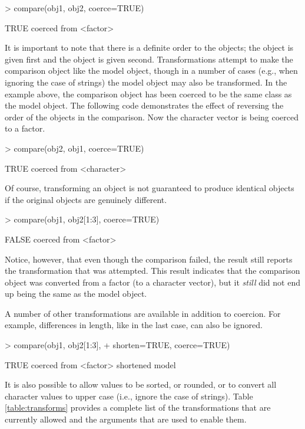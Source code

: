 \begin{Schunk}
\begin{Sinput}
> compare(obj1, obj2, coerce=TRUE)
\end{Sinput}
\begin{Soutput}
TRUE
  coerced from <factor>
\end{Soutput}
\end{Schunk}

It is important to note that there is a definite order to the
objects;  the  object is given first and the 
 object is given second.  Transformations
attempt to make the comparison object like the model object,
though in a number of cases (e.g., 
when ignoring the case of strings) the model object may also
be transformed.  In the example above, the comparison object
has been coerced to be the same class as
the model object.  The following code demonstrates the effect
of reversing the order of the objects in the comparison.  Now
the character vector is being coerced to a factor.

\begin{Schunk}
\begin{Sinput}
> compare(obj2, obj1, coerce=TRUE)
\end{Sinput}
\begin{Soutput}
TRUE
  coerced from <character>
\end{Soutput}
\end{Schunk}
Of course, transforming an object is not guaranteed to produce 
identical objects if the original objects are genuinely different.

\begin{Schunk}
\begin{Sinput}
> compare(obj1, obj2[1:3], coerce=TRUE)
\end{Sinput}
\begin{Soutput}
FALSE
  coerced from <factor>
\end{Soutput}
\end{Schunk}
Notice, however, that even though the comparison failed,
 the result still reports the transformation
that was attempted.  This result indicates that the comparison
object was converted from a factor (to a character vector), but it
\emph{still} did not end up being the same as the model object.

A number of other transformations are available 
in addition to coercion.  For example, differences in length, like
in the last case, can also be ignored.

\begin{Schunk}
\begin{Sinput}
> compare(obj1, obj2[1:3], 
+         shorten=TRUE, coerce=TRUE)
\end{Sinput}
\begin{Soutput}
TRUE
  coerced from <factor>
  shortened model
\end{Soutput}
\end{Schunk}
It is also possible to allow values to
be sorted, or rounded, or to convert all character values to upper case
(i.e., ignore the case of strings).
Table \ref{table:transforms} provides a complete list of the
transformations that are currently allowed and the arguments
that are used to enable them.  

